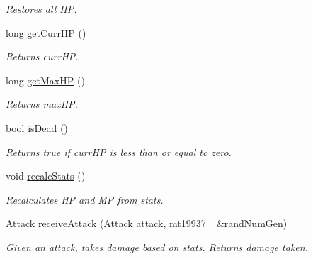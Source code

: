 \begin{DoxyCompactItemize}
\begin{DoxyCompactList}\small\item\em Restores all HP. \end{DoxyCompactList}\item 
long \hyperlink{class_unit_a111f87266234d9bd4a0d851f4d658d86}{get\+Curr\+HP} ()\hypertarget{class_unit_a111f87266234d9bd4a0d851f4d658d86}{}\label{class_unit_a111f87266234d9bd4a0d851f4d658d86}

\begin{DoxyCompactList}\small\item\em Returns curr\+HP. \end{DoxyCompactList}\item 
long \hyperlink{class_unit_a9aa287c4ed593378b03643b64c8481e5}{get\+Max\+HP} ()\hypertarget{class_unit_a9aa287c4ed593378b03643b64c8481e5}{}\label{class_unit_a9aa287c4ed593378b03643b64c8481e5}

\begin{DoxyCompactList}\small\item\em Returns max\+HP. \end{DoxyCompactList}\item 
bool \hyperlink{class_unit_a563978d397e42981db23ada6b3c21664}{is\+Dead} ()\hypertarget{class_unit_a563978d397e42981db23ada6b3c21664}{}\label{class_unit_a563978d397e42981db23ada6b3c21664}

\begin{DoxyCompactList}\small\item\em Returns true if curr\+HP is less than or equal to zero. \end{DoxyCompactList}\item 
void \hyperlink{class_unit_a4efc1e6aa3253a0d6fd4a39145287093}{recalc\+Stats} ()\hypertarget{class_unit_a4efc1e6aa3253a0d6fd4a39145287093}{}\label{class_unit_a4efc1e6aa3253a0d6fd4a39145287093}

\begin{DoxyCompactList}\small\item\em Recalculates HP and MP from stats. \end{DoxyCompactList}\item 
\hyperlink{class_attack}{Attack} \hyperlink{class_unit_ae8d9c7447cf51c11a7ef3ce8acbc6ae6}{receive\+Attack} (\hyperlink{class_attack}{Attack} \hyperlink{class_unit_af09235c061e2a98ab6fd74f99ecddc90}{attack}, mt19937\+\_ \&rand\+Num\+Gen)\hypertarget{class_unit_ae8d9c7447cf51c11a7ef3ce8acbc6ae6}{}\label{class_unit_ae8d9c7447cf51c11a7ef3ce8acbc6ae6}

\begin{DoxyCompactList}\small\item\em Given an attack, takes damage based on stats. Returns damage taken. \end{DoxyCompactList}\end{DoxyCompactItemize}
